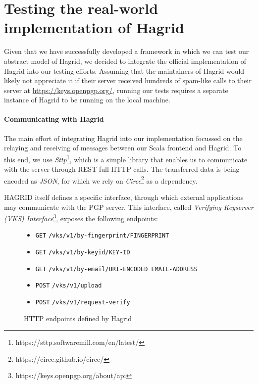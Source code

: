 \section{Testing the real-world implementation of Hagrid}
\label{sec:real_hagrid}
Given that we have successfully developed a framework in which we can test our abstract model of Hagrid, we decided to integrate the official implementation of Hagrid into our testing efforts.
Assuming that the maintainers of Hagrid would likely not appreciate it if their server received hundreds of spam-like calls to their server at \url{https://keys.openpgp.org/}, running our tests requires a separate instance of Hagrid to be running on the local machine.

\paragraph{Communicating with Hagrid}
The main effort of integrating Hagrid into our implementation focussed on the relaying and receiving of messages between our Scala frontend and Hagrid.
To this end, we use \emph{Sttp}\footnote{https://sttp.softwaremill.com/en/latest/}, which is a simple library that enables us to communicate with the server through REST-full HTTP calls. The transferred data is being encoded as \emph{JSON}, for which we rely on \emph{Circe}\footnote{https://circe.github.io/circe/} as a dependency.

HAGRID itself defines a specific interface, through which external applications may communicate with the PGP server. This interface, called \emph{Verifying Keyserver (VKS) Interface}\footnote{https://keys.openpgp.org/about/api}, exposes the following endpoints: 
\begin{figure}[h]
    \begin{itemize}
        \item \texttt{GET}  \texttt{/vks/v1/by-fingerprint/FINGERPRINT}
        \item \texttt{GET}  \texttt{/vks/v1/by-keyid/KEY-ID}
        \item \texttt{GET}  \texttt{/vks/v1/by-email/URI-ENCODED EMAIL-ADDRESS}
        \item \texttt{POST} \texttt{/vks/v1/upload}
        \item \texttt{POST} \texttt{/vks/v1/request-verify}
    \end{itemize}
    \caption{HTTP endpoints defined by Hagrid}
\end{figure}

